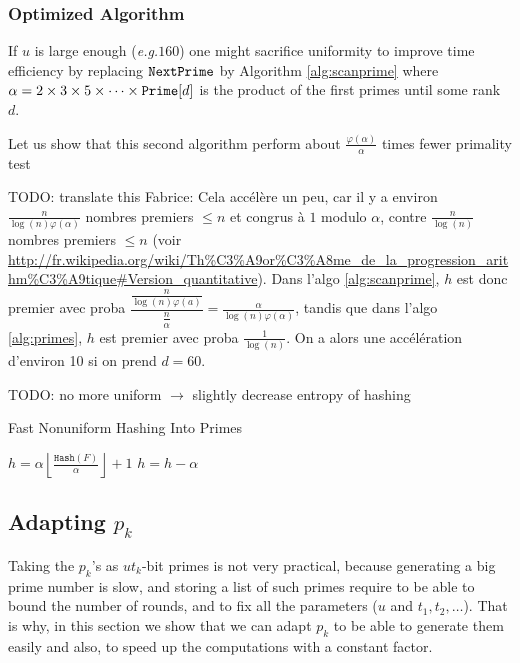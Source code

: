 \documentclass[11pt]{llncs}
\newcommand{\eg}{\textit{e.g.}\xspace}
\newcommand{\Hash}{\ensuremath{\mathtt{Hash}}}
\newcommand{\HashPrime}{\ensuremath{\mathtt{HashPrime}}}
\begin{document}
\subsubsection{Optimized Algorithm}
If $u$ is large enough (\eg $160$) one might sacrifice uniformity%
to improve time efficiency by replacing $\mbox{{\tt NextPrime}}$ by Algorithm \ref{alg:scanprime} where $\alpha=2\times 3\times 5\times \cdots \times \mbox{{\tt Prime}}[d]$ is the product of the first primes until some rank $d$.

Let us show that this second algorithm perform about $\frac{\varphi(\alpha)}{\alpha}$ times fewer primality test

TODO: translate this
Fabrice: Cela accélère un peu, car il y a environ $\frac{n}{\log(n) \varphi(\alpha)}$ nombres premiers $\le n$ et congrus à $1$ modulo $\alpha$, contre $\frac{n}{\log(n)}$ nombres premiers $\le n$ (voir \url{http://fr.wikipedia.org/wiki/Th%C3%A9or%C3%A8me_de_la_progression_arithm%C3%A9tique#Version_quantitative}).
Dans l'algo \ref{alg:scanprime}, $h$ est donc premier avec proba $\dfrac{\frac{n}{\log(n) \varphi(a)}}{\frac{n}{\alpha}} = \frac{\alpha}{\log(n) \varphi(\alpha)}$, tandis que dans l'algo \ref{alg:primes}, $h$ est premier avec proba $\frac{1}{\log(n)}$.
On a alors une accélération d'environ 10 si on prend $d=60$.

TODO: no more uniform $\longrightarrow$ slightly decrease entropy of hashing

\begin{algorithm}[t]
  \caption{Fast Nonuniform Hashing Into Primes}
  \label{alg:scanprime}
  \begin{algorithmic}[1]
  \State $h =\alpha \left\lfloor\frac{\Hash(F)}{\alpha}\right\rfloor+1$
\State $h = h-\alpha$
\EndWhile
\State {}
  \end{algorithmic}
\end{algorithm}

\subsection{Adapting $p_k$}
\label{sec:choicep}

Taking the $p_k$'s as $ut_k$-bit primes is not very practical, because generating a big prime number is slow, and storing a list of such primes require to be able to bound the number of rounds, and to fix all the parameters ($u$ and $t_1,t_2,\dots$).
That is why, in this section we show that we can adapt $p_k$ to be able to generate them easily and also, to speed up the computations with a constant factor.
\end{document}
